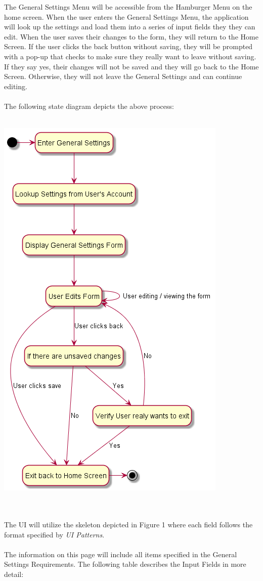 \documentclass{scrreprt}
\begin{document}
The General Settings Menu will be accessible from the Hamburger Menu on the home screen.  When the user enters the General Settings Menu, the application will look up the settings and load them into a series of input fields they they can edit.  When the user saves their changes to the form, they will return to the Home Screen.  If the user clicks the back button without saving, they will be prompted with a pop-up that checks to make sure they really want to leave without saving.  If they say yes, their changes will not be saved and they will go back to the Home Screen.  Otherwise, they will not leave the General Settings and can continue editing.
\\\\
The following state diagram depicts the above process:
\\\\
\begin{center}
\includegraphics[scale=0.5]{settings.png}
\end{center}
\\\\
The UI will utilize the skeleton depicted in Figure 1 where each field follows the format specified by \textit{UI Patterns}.
\\\\
The information on this page will include all items specified in the General Settings Requirements.  The following table describes the Input Fields in more detail:
\end{document}
